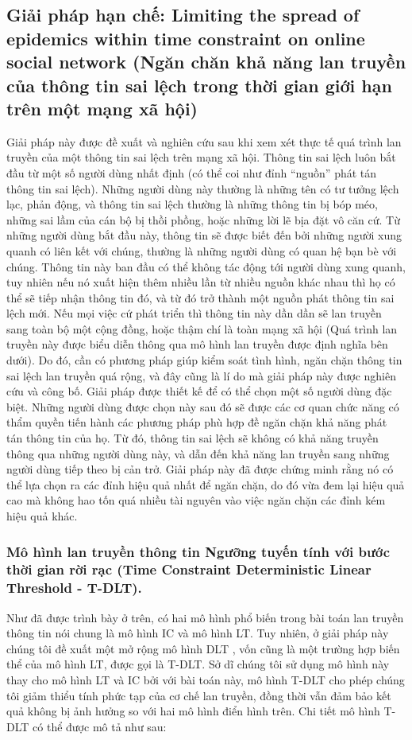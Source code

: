  	\subsection{Giải pháp hạn chế: Limiting the spread of epidemics within time constraint on online social network (Ngăn chăn khả năng lan truyền của thông tin sai lệch trong thời gian giới hạn trên một mạng xã hội)}
 	Giải pháp này được đề xuất và nghiên cứu sau khi xem xét thực tế quá trình lan truyền của một thông tin sai lệch trên mạng xã hội. Thông tin sai lệch luôn bắt đầu từ một số người dùng nhất định (có thể coi như đỉnh “nguồn” phát tán thông tin sai lệch). Những người dùng này thường là những tên có tư tưởng lệch lạc, phản động, và thông tin sai lệch thường là những thông tin bị bóp méo, những sai lầm của cán bộ bị thồi phồng, hoặc những lời lẽ bịa đặt vô căn cứ. Từ những người dùng bắt đầu này, thông tin sẽ được biết đến bởi những người xung quanh có liên kết với chúng, thường là những người dùng có quan hệ bạn bè với chúng. Thông tin này ban đầu có thể không tác động tới người dùng xung quanh, tuy nhiên nếu nó xuất hiện thêm nhiều lần từ nhiều nguồn khác nhau thì họ có thể sẽ tiếp nhận thông tin đó, và từ đó trở thành một nguồn phát thông tin sai lệch mới. Nếu mọi việc cứ phát triển thì thông tin này dần dần sẽ lan truyền sang toàn bộ một cộng đồng, hoặc thậm chí là toàn mạng xã hội (Quá trình lan truyền này được biểu diễn thông qua mô hình lan truyền được định nghĩa bên dưới). Do đó, cần có phương pháp giúp kiểm soát tình hình, ngăn chặn thông tin sai lệch lan truyền quá rộng, và đây cũng là lí do mà giải pháp này được nghiên cứu và công bố. Giải pháp được thiết kế để có thể chọn một số người dùng đặc biệt. Những người dùng được chọn này sau đó sẽ được các cơ quan chức năng có thẩm quyền tiến hành các phương pháp phù hợp đề ngăn chặn khả năng phát tán thông tin của họ. Từ đó, thông tin sai lệch sẽ không có khả năng truyền thông qua những người dùng này, và dẫn đến khả năng lan truyền sang những người dùng tiếp theo bị cản trở. Giải pháp này đã được chứng minh rằng nó có thể lựa chọn ra các đỉnh hiệu quả nhất để ngăn chặn, do đó vừa đem lại hiệu quả cao mà không hao tốn quá nhiều tài nguyên vào việc ngăn chặn các đỉnh kém hiệu quả khác.
 		\subsubsection{Mô hình lan truyền thông tin Ngưỡng tuyến tính với bước thời gian rời rạc (Time Constraint Deterministic Linear Threshold - T-DLT).}
 		Như đã được trình bày ở trên, có hai mô hình phổ biến trong bài toán lan truyền thông tin nói chung là mô hình IC và mô hình LT. Tuy nhiên, ở giải pháp này chúng tôi đề xuất một mở rộng mô hình DLT \cite{zaixin}, vốn cũng là một trường hợp biến thể của mô hình LT, được gọi là T-DLT. Sở dĩ chúng tôi sử dụng mô hình này thay cho mô hình LT và IC bởi với bài toán này, mô hình T-DLT cho phép chúng tôi giảm thiểu tính phức tạp của cơ chế lan truyền, đồng thời vẫn đảm bảo kết quả không bị ảnh hưởng so với hai mô hình điển hình trên. Chi tiết mô hình T-DLT có thể được mô tả như sau:
 		

